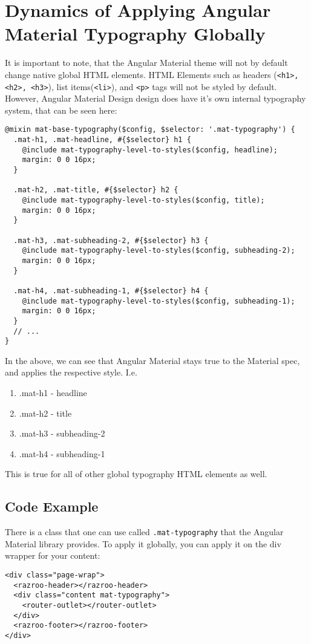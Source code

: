 \section{Dynamics of Applying Angular Material Typography Globally}
It is important to note, that the Angular Material theme will not by default 
change native global HTML elements. HTML Elements such as headers
(\lstinline{<h1>, <h2>, <h3>}), list items(\lstinline{<li>}), and \lstinline{<p>} 
tags will not be styled by default. However, Angular Material Design design 
does have it's own internal typography system, that can be seen here: 
\begin{lstlisting}[caption=@angular/material/\_theming.scss]
@mixin mat-base-typography($config, $selector: '.mat-typography') {
  .mat-h1, .mat-headline, #{$selector} h1 {
    @include mat-typography-level-to-styles($config, headline);
    margin: 0 0 16px;
  }

  .mat-h2, .mat-title, #{$selector} h2 {
    @include mat-typography-level-to-styles($config, title);
    margin: 0 0 16px;
  }

  .mat-h3, .mat-subheading-2, #{$selector} h3 {
    @include mat-typography-level-to-styles($config, subheading-2);
    margin: 0 0 16px;
  }

  .mat-h4, .mat-subheading-1, #{$selector} h4 {
    @include mat-typography-level-to-styles($config, subheading-1);
    margin: 0 0 16px;
  }  
  // ...
}
\end{lstlisting}

In the above, we can see that Angular Material stays true to the Material
spec, and applies the respective style. I.e. 
\begin{enumerate}
  \item .mat-h1 - headline
  \item .mat-h2 - title
  \item .mat-h3 - subheading-2
  \item .mat-h4 - subheading-1
\end{enumerate}

This is true for all of other global typography HTML elements as well. 

\subsection{Code Example}
There is a class that one can use called \lstinline{.mat-typography}
that the Angular Material library provides. To apply it globally, you 
can apply it on the div wrapper for your content: 
\begin{lstlisting}[caption=app.component.html]
<div class="page-wrap">
  <razroo-header></razroo-header>
  <div class="content mat-typography">
    <router-outlet></router-outlet>
  </div>
  <razroo-footer></razroo-footer>
</div>
\end{lstlisting}

